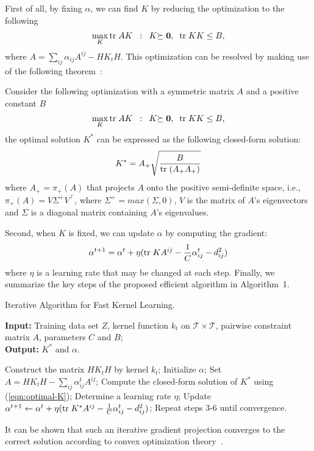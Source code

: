 First of all, by fixing $\alpha$, we can find $K$ by reducing the optimization to the following
\begin{eqnarray}\label{eqn:AB-sdp}
\max_{K}\tr AK\;\;:\;\;K\psd,\;\;\tr KK \leq B,
\end{eqnarray}
where $A=\sum_{ij} \alpha_{ij} A^{ij} - H K_t H$. This optimization can be resolved by making use of the following theorem~\cite{icml/ZhuangTH09}:
\begin{theorem}\label{thm:sdp-eigen_decom}
Consider the following optimization with a symmetric matrix $A$ and a
positive constant $B$
\begin{eqnarray}\label{eqn:AB-sdp}
\max_{K}\tr AK\;\;:\;\;K\psd,\;\;\tr KK \leq B,
\end{eqnarray}
the optimal solution $K^*$ can be expressed as the following closed-form solution:
\begin{equation}
K^*=A_+\sqrt{\frac{B}{\tr(A_+A_+)}}\label{eqn:optimal-K}
\end{equation}
where $A_+=\pi_+(A)$ that projects $A$ onto the positive semi-definite space, i.e., $\pi_+(A)=V\Sigma^+V^{\top}$, where $\Sigma^+=max(\Sigma,0)$, $V$ is the matrix of $A$'s eigenvectors and $\Sigma$ is a diagonal matrix containing $A$'s eigenvalues.
\end{theorem}

Second, when $K$ is fixed, we can update $\alpha$ by computing the gradient:
\[
\alpha^{t+1} = \alpha^{t} + \eta ({\mbox{tr}\;} KA^{ij} -\frac{1}{C}\alpha_{ij}^t - d^2_{ij})
\]
where $\eta$ is a learning rate that may be changed at each step. Finally,
we summarize the key steps of the proposed efficient algorithm in
Algorithm~1.

\begin{algorithm}[htbp]
\caption{Iterative Algorithm for Fast Kernel Learning.} \textbf{Input:} Training data set $Z$,
kernel function $k_t$ on $\mathcal T \times \mathcal T$, pairwise constraint matrix $A$, parameters $C$ and $B$;\\ \textbf{Output:} $K^*$ and $\alpha$.
\begin{algorithmic}
[1] \STATE Construct the matrix $H K_t H$ by kernel $k_t$;
\STATE Initialize $\alpha$;
\STATE Set $A = H K_t H - \sum_{ij}\alpha_{ij}^tA^{ij}$;
\STATE Compute the closed-form solution of $K^*$ using
(\ref{eqn:optimal-K});
\STATE Determine a learning rate $\eta$;
\STATE Update $\alpha^{t+1} \leftarrow \alpha^t + \eta ({\mbox{tr}\;} K^{*}A^{ij} -\frac{1}{C}\alpha_{ij}^t - d^2_{ij})$;
\STATE Repeat steps 3-6 until convergence.
\end{algorithmic}
\label{alg:iterative-npk}
\end{algorithm}
It can be shown that such an iterative gradient projection converges to the correct
solution according to convex optimization theory~\cite{siam/BoydX05}.

